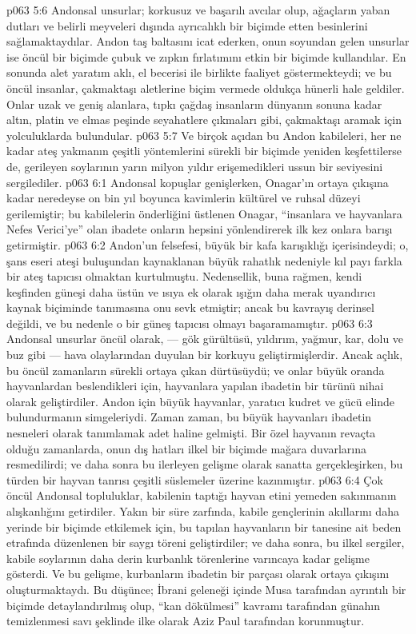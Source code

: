 \vs p063 5:6 Andonsal unsurlar; korkusuz ve başarılı avcılar olup, ağaçların yaban dutları ve belirli meyveleri dışında ayrıcalıklı bir biçimde etten besinlerini sağlamaktaydılar. Andon taş baltasını icat ederken, onun soyundan gelen unsurlar ise öncül bir biçimde çubuk ve zıpkın fırlatımını etkin bir biçimde kullandılar. En sonunda alet yaratım aklı, el becerisi ile birlikte faaliyet göstermekteydi; ve bu öncül insanlar, çakmaktaşı aletlerine biçim vermede oldukça hünerli hale geldiler. Onlar uzak ve geniş alanlara, tıpkı çağdaş insanların dünyanın sonuna kadar altın, platin ve elmas peşinde seyahatlere çıkmaları gibi, çakmaktaşı aramak için yolculuklarda bulundular.
\vs p063 5:7 Ve birçok açıdan bu Andon kabileleri, her ne kadar ateş yakmanın çeşitli yöntemlerini sürekli bir biçimde yeniden keşfettilerse de, gerileyen soylarının yarın milyon yıldır erişemedikleri ussun bir seviyesini sergilediler.
\vs p063 6:1 Andonsal kopuşlar genişlerken, Onagar’ın ortaya çıkışına kadar neredeyse on bin yıl boyunca kavimlerin kültürel ve ruhsal düzeyi gerilemiştir; bu kabilelerin önderliğini üstlenen Onagar, “insanlara ve hayvanlara Nefes Verici’ye” olan ibadete onların hepsini yönlendirerek ilk kez onlara barışı getirmiştir.
\vs p063 6:2 Andon’un felsefesi, büyük bir kafa karışıklığı içerisindeydi; o, şans eseri ateşi buluşundan kaynaklanan büyük rahatlık nedeniyle kıl payı farkla bir ateş tapıcısı olmaktan kurtulmuştu. Nedensellik, buna rağmen, kendi keşfinden güneşi daha üstün ve ısıya ek olarak ışığın daha merak uyandırıcı kaynak biçiminde tanımasına onu sevk etmiştir; ancak bu kavrayış derinsel değildi, ve bu nedenle o bir güneş tapıcısı olmayı başaramamıştır.
\vs p063 6:3 Andonsal unsurlar öncül olarak, --- gök gürültüsü, yıldırım, yağmur, kar, dolu ve buz gibi --- hava olaylarından duyulan bir korkuyu geliştirmişlerdir. Ancak açlık, bu öncül zamanların sürekli ortaya çıkan dürtüsüydü; ve onlar büyük oranda hayvanlardan beslendikleri için, hayvanlara yapılan ibadetin bir türünü nihai olarak geliştirdiler. Andon için büyük hayvanlar, yaratıcı kudret ve gücü elinde bulundurmanın simgeleriydi. Zaman zaman, bu büyük hayvanları ibadetin nesneleri olarak tanımlamak adet haline gelmişti. Bir özel hayvanın revaçta olduğu zamanlarda, onun dış hatları ilkel bir biçimde mağara duvarlarına resmedilirdi; ve daha sonra bu ilerleyen gelişme olarak sanatta gerçekleşirken, bu türden bir hayvan tanrısı çeşitli süslemeler üzerine kazınmıştır.
\vs p063 6:4 Çok öncül Andonsal topluluklar, kabilenin taptığı hayvan etini yemeden sakınmanın alışkanlığını getirdiler. Yakın bir süre zarfında, kabile gençlerinin akıllarını daha yerinde bir biçimde etkilemek için, bu tapılan hayvanların bir tanesine ait beden etrafında düzenlenen bir saygı töreni geliştirdiler; ve daha sonra, bu ilkel sergiler, kabile soylarının daha derin kurbanlık törenlerine varıncaya kadar gelişme gösterdi. Ve bu gelişme, kurbanların ibadetin bir parçası olarak ortaya çıkışını oluşturmaktaydı. Bu düşünce; İbrani geleneği içinde Musa tarafından ayrıntılı bir biçimde detaylandırılmış olup, “kan dökülmesi” kavramı tarafından günahın temizlenmesi savı şeklinde ilke olarak Aziz Paul tarafından korunmuştur.
